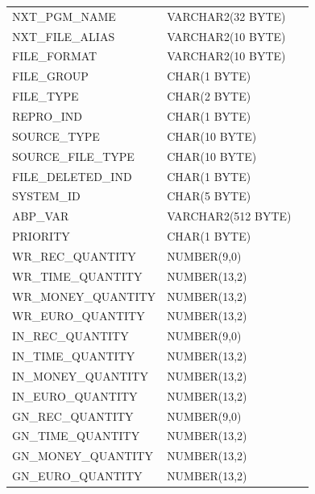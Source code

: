 \documentclass[12pt,twoside]{article}
\begin{document}
\begin{longtable}{lll}
 NXT\_PGM\_NAME                &  VARCHAR2(32 BYTE)   &               \\
 NXT\_FILE\_ALIAS              &  VARCHAR2(10 BYTE)   &               \\
 FILE\_FORMAT                  &  VARCHAR2(10 BYTE)   &               \\
 FILE\_GROUP                   &  CHAR(1 BYTE)        &               \\
 FILE\_TYPE                    &  CHAR(2 BYTE)        &               \\
 REPRO\_IND                    &  CHAR(1 BYTE)        &               \\
 SOURCE\_TYPE                  &  CHAR(10 BYTE)       &               \\
 SOURCE\_FILE\_TYPE            &  CHAR(10 BYTE)       &               \\
 FILE\_DELETED\_IND            &  CHAR(1 BYTE)        &               \\
 SYSTEM\_ID                    &  CHAR(5 BYTE)        &               \\
 ABP\_VAR                      &  VARCHAR2(512 BYTE)  &               \\
 PRIORITY                      &  CHAR(1 BYTE)        &               \\
 WR\_REC\_QUANTITY             &  NUMBER(9,0)         &               \\
 WR\_TIME\_QUANTITY            &  NUMBER(13,2)        &               \\
 WR\_MONEY\_QUANTITY           &  NUMBER(13,2)        &               \\
 WR\_EURO\_QUANTITY            &  NUMBER(13,2)        &               \\
 IN\_REC\_QUANTITY             &  NUMBER(9,0)         &               \\
 IN\_TIME\_QUANTITY            &  NUMBER(13,2)        &               \\
 IN\_MONEY\_QUANTITY           &  NUMBER(13,2)        &               \\
 IN\_EURO\_QUANTITY            &  NUMBER(13,2)        &               \\
 GN\_REC\_QUANTITY             &  NUMBER(9,0)         &               \\
 GN\_TIME\_QUANTITY            &  NUMBER(13,2)        &               \\
 GN\_MONEY\_QUANTITY           &  NUMBER(13,2)        &               \\
 GN\_EURO\_QUANTITY            &  NUMBER(13,2)        &               \\

\end{longtable}
\end{document}
